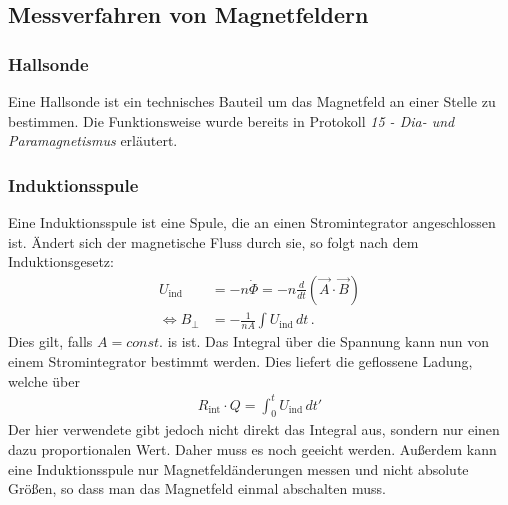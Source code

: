 \documentclass[12pt,a4paper,titlepage,headinclude,bibtotoc]{scrartcl}
\begin{document}
\subsection{Messverfahren von Magnetfeldern}
\subsubsection*{Hallsonde}
Eine Hallsonde ist ein technisches Bauteil um das Magnetfeld an einer Stelle zu bestimmen.
Die Funktionsweise wurde bereits in Protokoll \emph{15 - Dia- und Paramagnetismus} erläutert.

\subsubsection*{Induktionsspule}
Eine Induktionsspule ist eine Spule, die an einen Stromintegrator angeschlossen ist.
Ändert sich der magnetische Fluss durch sie, so folgt nach dem Induktionsgesetz:
\begin{align}
	U_\text{ind}&=-n\dot\Phi=-n\frac d{dt}(\vec A\cdot\vec B)\\
	\Leftrightarrow B_\perp &=-\frac{1}{nA}\int U_\text{ind}\, dt\,.
\end{align}
Dies gilt, falls $A=const.$ is ist.
Das Integral über die Spannung kann nun von einem Stromintegrator bestimmt werden.
Dies liefert die geflossene Ladung, welche über 
\begin{align}
	R_\text{int}\cdot Q=\int_0^t U_\text{ind}\, dt'
\end{align}
Der hier verwendete gibt jedoch nicht direkt das Integral aus, sondern nur einen dazu proportionalen Wert.
Daher muss es noch geeicht werden.
Außerdem kann eine Induktionsspule nur Magnetfeldänderungen messen und nicht absolute Größen, so dass man das Magnetfeld einmal abschalten muss.
\end{document}
